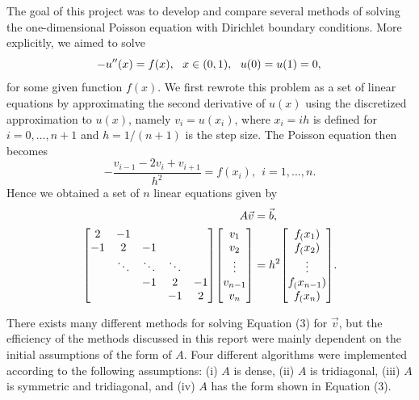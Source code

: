 \documentclass[prb,aps,twocolumn,showpacs,10pt]{revtex4-1}
\newenvironment{psmallmatrix}
  {\left[\begin{matrix}}
  {\end{matrix}\right]}
\begin{document}
The goal of this project was to develop and compare several methods of solving the one-dimensional Poisson equation with Dirichlet boundary conditions. More explicitly, we aimed to solve
\begin{equation}
-u''(x)=f(x), \ \ x \in (0,1), \ \ u(0)=u(1)=0,\\
\end{equation}
for some given function $f(x)$. We first rewrote this problem as a set of linear equations by approximating the second derivative of $u(x)$ using the discretized approximation to $u(x)$, namely $v_{i}=u(x_i)$, where $x_i=ih$ is defined for $i=0,...,n+1$ and $h=1/(n+1)$ is the step size. The Poisson equation then becomes
\begin{equation}
-\frac{v_{i-1}-2v_i+v_{i+1}}{h^2}=f(x_i), \ \ i = 1, ..., n.
\end{equation} 
Hence we obtained a set of $n$ linear equations given by
\begin{align}
\label{eqn:eqlabel}
\begin{split}
A\vec{v} &= \vec{b},
\\
\begin{psmallmatrix} 2&-1& \\
-1&2&-1\\
&\ddots&\ddots&\ddots\\
&&-1&2&-1\\
&&&-1&2\\
\end{psmallmatrix}
\begin{psmallmatrix}
v_1\\v_2\\ \vdots \\ v_{n-1}\\ v_n
\end{psmallmatrix}&= h^2
\begin{psmallmatrix}
f_(x_1)\\f_(x_2)\\ \vdots \\ f_(x_{n-1})\\ f_(x_n)
\end{psmallmatrix}.
\end{split}
\end{align}

There exists many different methods for solving Equation (3) for $\vec{v}$, but the efficiency of the methods discussed in this report were mainly dependent on the initial assumptions of the form of $A$. Four different algorithms were implemented according to the following assumptions: (i) $A$ is dense, (ii) $A$ is tridiagonal, (iii) $A$ is symmetric and tridiagonal, and (iv) $A$ has the form shown in Equation (3).\\
\end{document}
